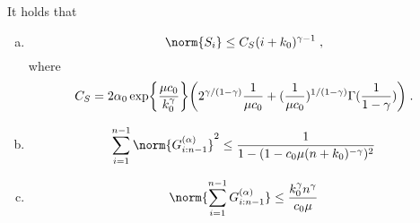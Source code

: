 \begin{lemma}
\label{bound_G_S}
It holds that 
\begin{enumerate}[(a)]
\item 
\begin{equation}
    \norm{S_i}\leq C_{S}(i + k_0)^{\gamma-1}\eqsp,
\end{equation}
where 
$$
C_{S} = 2\alpha_0\exp\biggl\{\frac{\mu c_0}{k_0^{\gamma}}\biggr\}\biggl(2^{\gamma/(1-\gamma)}\frac{1}{\mu c_0} + (\frac{1}{\mu c_0})^{1/(1-\gamma)}\Gamma(\frac{1}{1-\gamma})\biggr)\;.
$$
\item 
\begin{equation}
    \sum_{i=1}^{n-1}\norm{G_{i:n-1}^{(\alpha)}}^2\leq \frac{1}{1 - (1 - c_0\mu(n+k_0)^{-\gamma})^2}
\end{equation}
\item 
\begin{equation}
    \norm{\sum_{i=1}^{n-1}G_{i:n-1}^{(\alpha)}}\leq \frac{k_0^\gamma n^\gamma}{c_0\mu}
\end{equation}
\end{enumerate}
\end{lemma}
